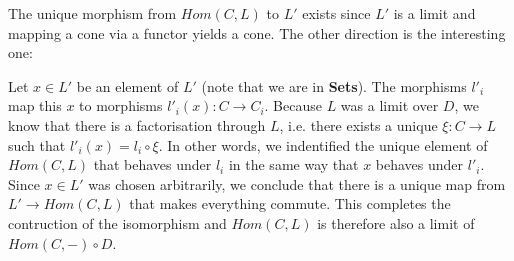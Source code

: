 \documentclass{scrartcl}
\begin{document}
    The unique morphism from $Hom(C,L)$ to $L'$ exists since $L'$ is a limit and mapping a cone via a functor yields a cone. The other direction is the interesting one:
    
    Let $x ∈ L'$ be an element of $L'$ (note that we are in {\bf Sets}). The morphisms $l'_i$ map this $x$ to morphisms $l'_i(x) : C → C_i$. Because $L$ was a limit over $D$, we know that there is a factorisation through $L$, i.e. there exists a unique $ξ : C → L$ such that $l'_i(x) = l_i \circ ξ$. In other words, we indentified the unique element of $Hom(C,L)$ that behaves under $l_i$ in the same way that $x$ behaves under $l'_i$. Since $x ∈ L'$ was chosen arbitrarily, we conclude that there is a unique map from $L' → Hom(C,L)$ that makes everything commute. This completes the contruction of the isomorphism and $Hom(C,L)$ is therefore also a limit of $Hom(C,-) \circ D$.
\end{document}
